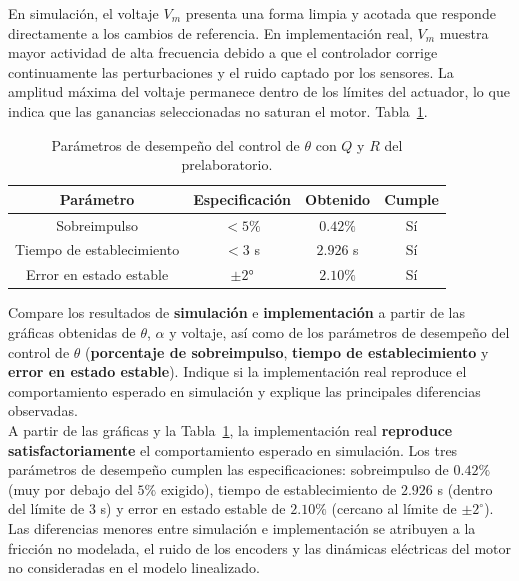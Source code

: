 \noindent En simulación, el voltaje $V_m$ presenta una forma limpia y acotada que responde directamente a los cambios de referencia. En implementación real, $V_m$ muestra mayor actividad de alta frecuencia debido a que el controlador corrige continuamente las perturbaciones y el ruido captado por los sensores. La amplitud máxima del voltaje permanece dentro de los límites del actuador, lo que indica que las ganancias seleccionadas no saturan el motor.
Tabla~\ref{tab:act1_desempeno_inicial}.

\begin{table}[H]
\centering
\caption{Parámetros de desempeño del control de $\theta$ con $Q$ y $R$ del prelaboratorio.}
\label{tab:act1_desempeno_inicial}
\renewcommand{\arraystretch}{1.3}
\begin{tabular}{|c|c|c|c|}
\hline
\textbf{Parámetro} & \textbf{Especificación} & \textbf{Obtenido} & \textbf{Cumple} \\\hline
Sobreimpulso          & $< 5\%$  & $0.42\%$  & Sí \\\hline
Tiempo de establecimiento & $< 3$ s  & $2.926$ s & Sí \\\hline
Error en estado estable & $\pm 2°$ & $2.10\%$ & Sí \\\hline
\end{tabular}
\end{table}

Compare los resultados de \textbf{simulación} e \textbf{implementación} a partir de las gráficas obtenidas de $\theta$, $\alpha$ y voltaje, así como de los parámetros de desempeño del control de $\theta$ (\textbf{porcentaje de sobreimpulso}, \textbf{tiempo de establecimiento} y \textbf{error en estado estable}). Indique si la implementación real reproduce el comportamiento esperado en simulación y explique las principales diferencias observadas. \\
\noindent A partir de las gráficas y la Tabla~\ref{tab:act1_desempeno_inicial}, la implementación real \textbf{reproduce satisfactoriamente} el comportamiento esperado en simulación. Los tres parámetros de desempeño cumplen las especificaciones: sobreimpulso de $0.42\%$ (muy por debajo del $5\%$ exigido), tiempo de establecimiento de $2.926$ s (dentro del límite de $3$ s) y error en estado estable de $2.10\%$ (cercano al límite de $\pm 2^\circ$). Las diferencias menores entre simulación e implementación se atribuyen a la fricción no modelada, el ruido de los encoders y las dinámicas eléctricas del motor no consideradas en el modelo linealizado.

